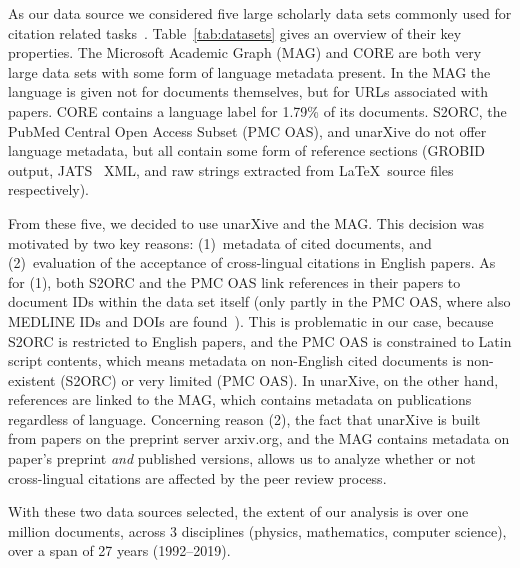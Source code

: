 As our data source we considered five large scholarly data sets commonly used for citation related tasks~\cite{Khan2017,Faerber202x}. Table~\ref{tab:datasets} gives an overview of their key properties. The Microsoft Academic Graph (MAG) and CORE are both very large data sets with some form of language metadata present. In the MAG the language is given not for documents themselves, but for URLs associated with papers. CORE contains a language label for 1.79\% of its documents. S2ORC, the PubMed Central Open Access Subset (PMC OAS), and unarXive do not offer language metadata, but all contain some form of reference sections (GROBID output, JATS~\cite{Huh2014} XML, and raw strings extracted from \LaTeX~source files respectively).

From these five, we decided to use unarXive and the MAG. This decision was motivated by two key reasons: (1)~metadata of cited documents, and (2)~evaluation of the acceptance of cross-lingual citations in English papers. As for (1), both S2ORC and the PMC OAS link references in their papers to document IDs within the data set itself (only partly in the PMC OAS, where also MEDLINE IDs and DOIs are found~\cite{Gipp2015}). This is problematic in our case, because S2ORC is restricted to English papers, and the PMC OAS is constrained to Latin script contents, which means metadata on non-English cited documents is non-existent (S2ORC) or very limited (PMC OAS). In unarXive, on the other hand, references are linked to the MAG, which contains metadata on publications regardless of language. Concerning reason (2), the fact that unarXive is built from papers on the preprint server arxiv.org, and the MAG contains metadata on paper's preprint \emph{and} published versions, allows us to analyze whether or not cross-lingual citations are affected by the peer review process.

With these two data sources selected, the extent of our analysis is over one million documents, across 3 disciplines (physics, mathematics, computer science), over a span of 27 years (1992--2019).

